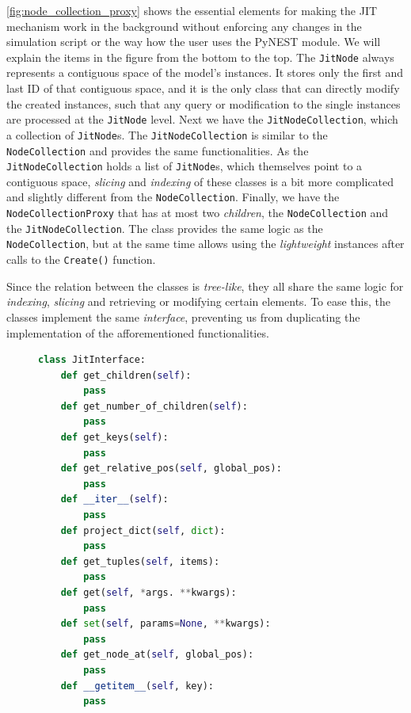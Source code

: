 \autoref{fig:node_collection_proxy} shows the essential elements for making the JIT mechanism work in the background without enforcing any changes in the simulation script or the way how the user uses the PyNEST module. We will explain the items in the figure from the bottom to the top. The \texttt{JitNode} always represents a contiguous space of the model's instances. It stores only the first and last ID of that contiguous space, and it is the only class that can directly modify the created instances, such that any query or modification to the single instances are processed at the \texttt{JitNode} level. Next we have the \texttt{JitNodeCollection}, which a collection of \texttt{JitNode}s. The \texttt{JitNodeCollection} is similar to the \texttt{NodeCollection} and provides the same functionalities. As the \texttt{JitNodeCollection} holds a list of \texttt{JitNode}s, which themselves point to a contiguous space, \emph{slicing} and \emph{indexing} of these classes is a bit more complicated and slightly different from the \texttt{NodeCollection}. Finally, we have the \texttt{NodeCollectionProxy} that has at most two \emph{children}, the \texttt{NodeCollection} and the \texttt{JitNodeCollection}. The class provides the same logic as the \texttt{NodeCollection}, but at the same time allows using the \emph{lightweight} instances after calls to the \texttt{Create()} function.

Since the relation between the classes is \emph{tree-like}, they all share the same logic for \emph{indexing}, \emph{slicing} and retrieving or modifying certain elements. To ease this, the classes implement the same \emph{interface}, preventing us from duplicating the implementation of the afforementioned functionalities.

\begin{figure}[ht!]
\centering
\begin{lstlisting}[language=Python, label=lst:jit_interface, caption={The JitInterface}]
class JitInterface:
    def get_children(self):
        pass
    def get_number_of_children(self):
        pass
    def get_keys(self):
        pass
    def get_relative_pos(self, global_pos):
        pass
    def __iter__(self):
        pass
    def project_dict(self, dict):
        pass
    def get_tuples(self, items):
        pass
    def get(self, *args. **kwargs):
        pass
    def set(self, params=None, **kwargs):
        pass
    def get_node_at(self, global_pos):
        pass
    def __getitem__(self, key):
        pass
\end{lstlisting}
\end{figure}

